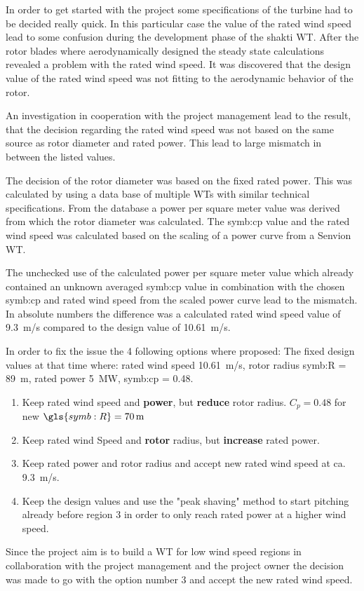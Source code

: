 In order to get started with the project some specifications of the turbine had to be decided really quick.
In this particular case the value of the rated wind speed lead to some confusion during the development phase of the \gls{shakti} WT.
After the rotor blades where aerodynamically designed the steady state calculations revealed a problem with the rated wind speed.
It was discovered that the design value of the rated wind speed was not fitting to the aerodynamic behavior of the rotor.

An investigation in cooperation with the project management lead to the result, that the decision regarding the rated wind speed was not based on the same source as rotor diameter and rated power.
This lead to large mismatch in between the listed values.

The decision of the rotor diameter was based on the fixed rated power. 
This was calculated by using a data base of multiple WTs with similar technical specifications.
From the database a power per square meter value was derived from which the rotor diameter was calculated.
The \gls{symb:cp} value and the rated wind speed was calculated based on the scaling of a power curve from a Senvion WT.

The unchecked use of the calculated power per square meter value which already contained an unknown averaged \gls{symb:cp} value in combination with the chosen \gls{symb:cp} and rated wind speed from the scaled power curve lead to the mismatch. In absolute numbers the difference was a calculated rated wind speed value of \SI{9.3}{m/s} compared to the design value of \SI{10.61}{m/s}.

In order to fix the issue the 4 following options where proposed:
The fixed design values at that time where: rated wind speed \SI{10.61}{m/s}, rotor radius \gls{symb:R} = \SI{89}{m}, rated power \SI{5}{MW}, \gls{symb:cp} = \SI{0.48}{}.
\begin{enumerate}
	\item Keep rated wind speed and \textbf{power}, but \textbf{reduce} rotor radius. $C_p = 0.48$ for new $\gls{symb:R} = \SI{70}{m}$
	\item Keep rated wind Speed and \textbf{rotor} radius, but \textbf{increase} rated power.
	\item Keep rated power and rotor radius and accept new rated wind speed at ca. \SI{9.3}{m/s}.
	\item Keep the design values and use the "peak shaving" method to start pitching already before region 3 in order to only reach rated power at a higher wind speed.
\end{enumerate}

Since the project aim is to build a WT for low wind speed regions in collaboration with the project management and the project owner the decision was made to go with the option number 3 and accept the new rated wind speed. 